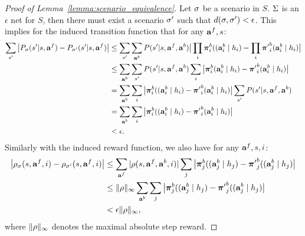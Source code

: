 \begin{proof}[Proof of Lemma~\ref{lemma:scenario_equivalence}]
Let $\sigma$ be a scenario in $S$. $\Sigma$ is an $\epsilon$ net for $S$, then there must exist a scenario $\sigma'$ such that $d(\sigma, \sigma')<\epsilon$. 
This implies for the induced transition function that for any $\mathbf{a}^f, s$:
        \begin{align}
            \sum_{s'}\big|P_\sigma(s'| s, \mathbf{a}^f) - P_{\sigma'}(s'| s, \mathbf{a}^f) \big| & \leq \sum_{s'}\sum_{\mathbf{a}^b} P(s'| s, \mathbf{a}^f, \mathbf{a}^b) \big|\prod_i{\boldsymbol{\pi}}_i^b((\mathbf{a}^b_i \mid h_i)-\prod_i{\boldsymbol{\pi}'}_i^b(\mathbf{a}^b_i \mid h_i) \big| \\
            &\leq \sum_{\mathbf{a}^b} \sum_{s'} P(s'| s, \mathbf{a}^f, \mathbf{a}^b) \sum_i \big|{\boldsymbol{\pi}}_i^b(\mathbf{a}^b_i \mid h_i) - {\boldsymbol{\pi}'}_i^b(\mathbf{a}^b_i \mid h_i) \big|  \\
            &= \sum_{\mathbf{a}^b} \sum_i \big|{\boldsymbol{\pi}}_i^b((\mathbf{a}^b_i \mid h_i) - {\boldsymbol{\pi}'}_i^b(\mathbf{a}^b_i \mid h_i) \big|\sum_{s'} P(s'| s, \mathbf{a}^f, \mathbf{a}^b) \\
            &= \sum_{\mathbf{a}^b} \sum_i \big|{\boldsymbol{\pi}}_i^b((\mathbf{a}^b_i \mid h_i) - {\boldsymbol{\pi}'}_i^b(\mathbf{a}^b_i \mid h_i) \big| \\
            & < \epsilon.
        \end{align}
Similarly with the induced reward function, we also have for any $\mathbf{a}^f, s,  i$: 
        \begin{align}
            \label{eq:reward_similarity}
            \big|\rho_\sigma(s, \mathbf{a}^f, i) - \rho_{\sigma'}(s, \mathbf{a}^f, i) \big| & \leq \sum_{\mathbf{a}^f} |\rho(s, \mathbf{a}^f, \mathbf{a}^b, i)| \sum_j \big| {\boldsymbol{\pi}}_j^b((\mathbf{a}^b_j \mid h_j)-{\boldsymbol{\pi}'}_j^b((\mathbf{a}^b_j \mid h_j) \big| \\ 
            & \leq \lVert \rho \rVert_\infty \sum_{\mathbf{a}^b} \sum_j \big| {\boldsymbol{\pi}}_j^b((\mathbf{a}^b_j \mid h_j)-{\boldsymbol{\pi}'}_j^b((\mathbf{a}^b_j \mid h_j) \big| \\
            & < \epsilon\lVert \rho \rVert_\infty,
        \end{align}
        where $\lVert \rho \rVert_\infty$ denotes the maximal absolute step reward.


\end{proof}
